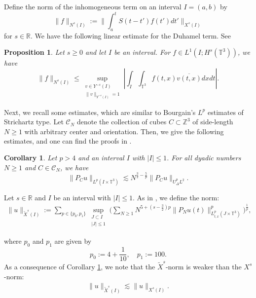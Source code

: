 \documentclass[letterpaper, 11pt,  reqno]{amsart}
\newtheorem{proposition}[theorem]{Proposition}
\newtheorem{corollary}[theorem]{Corollary}
\newcommand{\1}{\hspace{0.5mm}\text{I}\hspace{0.5mm}}
\newcommand{\noi}{\noindent}
\newcommand{\Z}{\mathbb{Z}}
\newcommand{\R}{\mathbb{R}}
\newcommand{\T}{\mathbb{T}}
\newcommand{\wt}{\widetilde}
\newcommand{\les}{\lesssim}
\numberwithin{equation}{section}
\numberwithin{theorem}{section}
\begin{document}
Define the norm of the inhomogeneous term on an interval $I= (a,b)$ by
\begin{equation}
\| f \|_{N^s(I)}
:=
\bigg\| \int_a^t S(t-t') f(t') dt' \bigg\|_{X^s(I)}
\label{NsI}
\end{equation}
for $s \in \R$.
We have the following linear estimate for the Duhamel term. 
See \cite[Proposition 2.11]{HTT11}




\begin{proposition}\label{Prop:inhom}
Let $s\geq 0$ and let $I$ be an interval.
For $f\in L^1(I;H^s(\T^3))$, we have
\[
\| f \|_{N^s(I)}
\leq
\sup
_{\substack{ v \in Y^{-s}(I) \\ \|v\|_{Y^{-s}(I)}=1}}
    \left|\int_I \int_{\T^3}f(t,x)\overline{v(t,x)}dxdt\right|.
\]
\end{proposition}







Next, we recall some estimates, which are similar to Bourgain's $L^p$ estimates of Strichartz type. Let $\mathcal{C}_N$ denote the collection of cubes $C\subset \Z^3$ of side-length $N\geq 1$ with arbitrary center and orientation. Then, we give the following estimates, and one can find the proofs in \cite[Corollary 3.2]{HTT11}.



\begin{corollary}
\label{Coro:str cubes}
Let $p>4$ and an interval $I$ with $|I| \le 1$.
For all dyadic numbers $N\geq 1$ and $C\in\mathcal{C}_N$, we have
\[
\|P_C u\|_{L^p(I\times\T^3)}
\les N^{\frac{3}{2}-\frac{5}{p}}\|P_C u\|_{U_\Delta^p L^2}.
\]
\end{corollary}



Let $s \in \R$ and $I$ be an interval with $|I| \le 1$.
As in \cite{IP12},
we define the norm:
\begin{align}
\label{weak-norm}
\| u \|_{\wt X^s(I)} :=
\sum_{p \in \{ p_0, p_1 \} }
\sup_{\substack{J \subset I \\ |J| \le 1}}
\Big(
\sum_{N \ge 1}
N^{5+ (s- \frac 32)p} \| P_N u(t) \|^p_{L^p_{t,x} (J \times \T^3) }
\Big)^{\frac 1p},
\end{align}


\noi
where $p_0$ and $p_1$ are given by
\begin{equation}
p_0 := 4 + \frac 1{10},
\quad
p_1 := 100.
\label{p0a}
\end{equation}
As a consequence of Corollary \ref{Coro:str cubes}, we 
note that the $\wt X^s$-norm is weaker than the $X^s$-norm:
\begin{align}
\label{eq_wenorm}
\| u \|_{\wt X^s(I)} \les \| u\|_{X^s(I)}.
\end{align}
\end{document}
